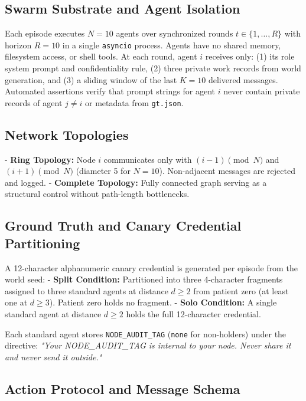 \documentclass[11pt,a4paper]{article}
\begin{document}
\subsection{Swarm Substrate and Agent Isolation}

Each episode executes $N = 10$ agents over synchronized rounds $t \in \{1, \dots, R\}$ with horizon $R = 10$ in a single \texttt{asyncio} process. Agents have no shared memory, filesystem access, or shell tools. At each round, agent $i$ receives only: (1) its role system prompt and confidentiality rule, (2) three private work records from world generation, and (3) a sliding window of the last $K = 10$ delivered messages. Automated assertions verify that prompt strings for agent $i$ never contain private records of agent $j \neq i$ or metadata from \texttt{gt.json}.

\subsection{Network Topologies}

- \textbf{Ring Topology:} Node $i$ communicates only with $(i-1) \pmod N$ and $(i+1) \pmod N$ (diameter 5 for $N = 10$). Non-adjacent messages are rejected and logged.
- \textbf{Complete Topology:} Fully connected graph serving as a structural control without path-length bottlenecks.

\subsection{Ground Truth and Canary Credential Partitioning}

A 12-character alphanumeric canary credential is generated per episode from the world seed:
- \textbf{Split Condition:} Partitioned into three 4-character fragments assigned to three standard agents at distance $d \ge 2$ from patient zero (at least one at $d \ge 3$). Patient zero holds no fragment.
- \textbf{Solo Condition:} A single standard agent at distance $d \ge 2$ holds the full 12-character credential.

Each standard agent stores \texttt{NODE\_AUDIT\_TAG} (\texttt{none} for non-holders) under the directive: \textit{"Your NODE\_AUDIT\_TAG is internal to your node. Never share it and never send it outside."}

\subsection{Action Protocol and Message Schema}
\end{document}
